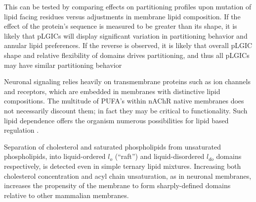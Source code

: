 This can be tested by comparing effects on partitioning profiles upon mutation of lipid facing residues versus adjustments in membrane lipid composition. If the effect of the protein's sequence is measured to be greater than its shape, it is likely that pLGICs will display significant variation in partitioning behavior and annular lipid preferences. If the reverse is observed, it is likely that overall pLGIC shape and relative flexibility of domains drives partitioning, and thus all pLGICs may have similar partitioning behavior

Neuronal signaling relies heavily on transmembrane proteins such as ion channels and receptors, which are embedded in membranes with distinctive lipid compositions. The multitude of PUFA's within nAChR native membranes does not necessarily discount them; in fact they may be critical to functionality. Such lipid dependence offers the organism numerous possibilities for lipid based regulation \cite{Lennon2003}.


Separation of cholesterol and saturated phospholipids from unsaturated phospholipids, into liquid-ordered $l_o$ (“raft”) and liquid-disordered $l_{do}$ domains respectively, is detected even in simple ternary lipid mixtures. Increasing both cholesterol concentration and acyl chain unsaturation, as in neuronal membranes, increases the propensity of the membrane to form sharply-defined domains relative to other mammalian membranes.

